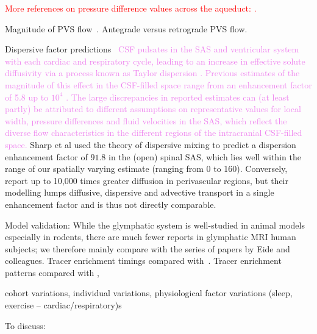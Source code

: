 \documentclass[fleqn,10pt]{wlscirep}
\newcommand{\mar}[1]{\textcolor{violet}{#1}}
\newcommand{\fixme}[1]{\textcolor{red}{#1}}
\newcommand{\draft}[1]{\textcolor{lightgray}{#1}}
\begin{document}
\fixme{More references on pressure difference values across the aqueduct:
\cite{liu2025transmantle,karki2025real,ayansiji2025p174}.}

Magnitude of PVS flow~\cite{mestre2018flow,
  bedussi2018paravascular}. Antegrade versus retrograde PVS flow.


Dispersive factor predictions~\cite{sharp2019dispersion, ray2021quantitative}
\mar{CSF pulsates in the SAS and ventricular system with each cardiac and respiratory cycle, leading to an increase in effective solute diffusivity via a process known as Taylor dispersion \cite{taylor1953dispersion, watson1983diffusion}. Previous estimates of the magnitude of this effect in the CSF-filled space range from an enhancement factor of 5.8 \cite{keith2019dispersion} up to $10^4$ \cite{ray2021quantitative}. The large discrepancies in reported estimates can (at least partly) be attributed to different assumptions on representative values for local width, pressure differences and fluid velocities in the SAS, which reflect the diverse flow characteristics in the different regions of the intracranial CSF-filled space.} Sharp et al used the theory of dispersive mixing to predict a dispersion enhancement factor of $91.8$ in the (open) spinal SAS, which lies well within the range of our spatially varying estimate (ranging from 0 to 160). Conversely, \cite{ray2021quantitative} report up to 10,000 times greater diffusion in perivascular regions, but their modelling lumps diffusive, dispersive and advective transport in a single enhancement factor and is thus not directly comparable.


Model validation: While the glymphatic system is well-studied in
animal models especially in rodents, there are much fewer reports in
glymphatic MRI human subjects; we therefore mainly compare with the
series of papers by Eide and colleagues. Tracer enrichment timings
compared with~\cite{eide2024functional, yamamoto2024perivascular}.
Tracer enrichment patterns compared with \cite{ringstad2017glymphatic,
  ringstad2018brain, eide2021sleep}, 


cohort variations, individual variations, physiological factor
variations (sleep, exercise -- cardiac/respiratory)s

To discuss: \cite{hauglund2025norepinephrine}

\draft{\lipsum[1-5]}
\end{document}
